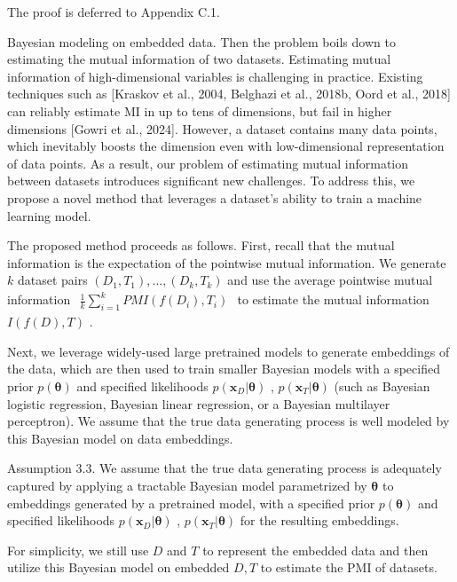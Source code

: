 The proof is deferred to Appendix C.1.

Bayesian modeling on embedded data. Then the problem boils down to
estimating the mutual information of two datasets. Estimating mutual
information of high-dimensional variables is challenging in practice.
Existing techniques such as {[}Kraskov et al., 2004, Belghazi et al.,
2018b, Oord et al., 2018{]} can reliably estimate MI in up to tens of
dimensions, but fail in higher dimensions {[}Gowri et al., 2024{]}.
However, a dataset contains many data points, which inevitably boosts
the dimension even with low-dimensional representation of data points.
As a result, our problem of estimating mutual information between
datasets introduces significant new challenges. To address this, we
propose a novel method that leverages a dataset's ability to train a
machine learning model.

The proposed method proceeds as follows. First, recall that the mutual
information is the expectation of the pointwise mutual information. We
generate \(k\) dataset pairs
\(( D _ { 1 } , T _ { 1 } ) , \dots , ( D _ { k } , T _ { k } )\) and
use the average pointwise mutual information
\(\begin{array} { r } { \frac { 1 } { k } \sum _ { i = 1 } ^ { k } P M I ( f ( D _ { i } ) , T _ { i } ) } \end{array}\)
to estimate the mutual information \(I ( f ( D ) , T )\) .

Next, we leverage widely-used large pretrained models to generate
embeddings of the data, which are then used to train smaller Bayesian
models with a specified prior \(p ( \pmb \theta )\) and specified
likelihoods \(p ( \mathbf { x } _ { D } | \pmb { \theta } )\) ,
\(p ( \mathbf { x } _ { T } | \pmb { \theta } )\) (such as Bayesian
logistic regression, Bayesian linear regression, or a Bayesian
multilayer perceptron). We assume that the true data generating process
is well modeled by this Bayesian model on data embeddings.

Assumption 3.3. We assume that the true data generating process is
adequately captured by applying a tractable Bayesian model parametrized
by \(\pmb \theta\) to embeddings generated by a pretrained model, with a
specified prior \(p ( \pmb \theta )\) and specified likelihoods
\(p ( \mathbf { x } _ { D } | \pmb { \theta } )\) ,
\(p ( \mathbf { x } _ { T } | \pmb { \theta } )\) for the resulting
embeddings.

For simplicity, we still use \(D\) and \(T\) to represent the embedded
data and then utilize this Bayesian model on embedded \(D , T\) to
estimate the PMI of datasets.


